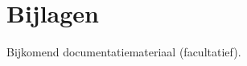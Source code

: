 \documentclass[a4paper,oneside,11pt,final]{memoir}
\begin{document}

\section*{Bijlagen} \label{sec:Bijlagen}
Bijkomend documentatiemateriaal (facultatief). 
\end{document}

